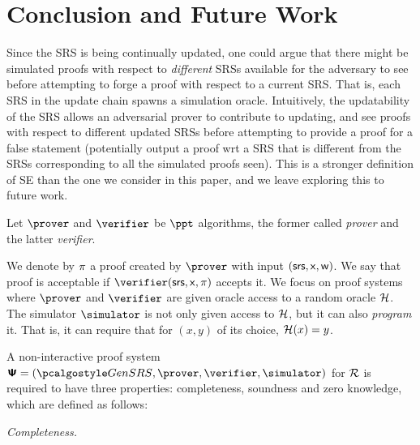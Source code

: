 \documentclass[10pt]{llncs}
\newcommand{\ourpar}[1] {\smallskip\noindent\emph{#1}}
\begin{document}
\section{Conclusion and Future Work}

Since the SRS is being continually updated, one could argue that there might be
simulated proofs with respect to \textit{different} SRSs available for the adversary
to see before attempting to forge a proof with respect to a current SRS.  That is,
each SRS in the update chain spawns a simulation oracle. Intuitively, the
updatability of the SRS allows an adversarial prover to contribute to updating, and
see proofs with respect to different updated SRSs before attempting to provide a
proof for a false statement (potentially output a proof wrt a SRS that is different
from the SRSs corresponding to all the simulated proofs seen).  This is a stronger
definition of SE than the one we consider in this paper, and we leave exploring this
to future work.




\appendix




%


%
%

\iffalse
Let $\prover$ and $\verifier$ be $\ppt$ algorithms, the former called \emph{prover}
and the latter \emph{verifier}. 

We denote by $\pi$ a proof created by $\prover$ with input
$(\mathsf{srs}, \mathsf{x}, \mathsf{w})$. We say that proof is acceptable if $\verifier (\srs, \inp,
\zkproof)$ accepts it. We focus on proof systems where $\prover$ and
$\verifier$ are given oracle access to a random oracle $\mathcal{H}$. The simulator
$\simulator$ is not only given access to $\mathcal{H}$, but it can also \emph{program}
it. That is, it can require that for $(x, y)$ of its choice, $\mathcal{H} (x) = y$.

A non-interactive  proof system $\proofsystem = (\kgen, \prover, \verifier, \simulator)$ for $\mathcal{R}$ is
required to have three properties: completeness, soundness and zero knowledge, which are
defined as follows:

\ourpar{Completeness.}
\end{document}
